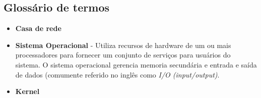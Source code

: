 \documentclass{article}
\begin{document}
\subsection{Glossário de termos}

\begin{itemize}
\item \textbf{Casa de rede}
\item \textbf{Sistema Operacional} - Utiliza recursos de hardware de um ou mais processadores para fornecer um conjunto de serviços para usuários do sistema. O sistema operacional gerencia memoria secundária e entrada e saída de dados (comumente referido no inglês como \textit{I/O (input/output)}.
\item \textbf{Kernel}
\end{itemize}
\end{document}
